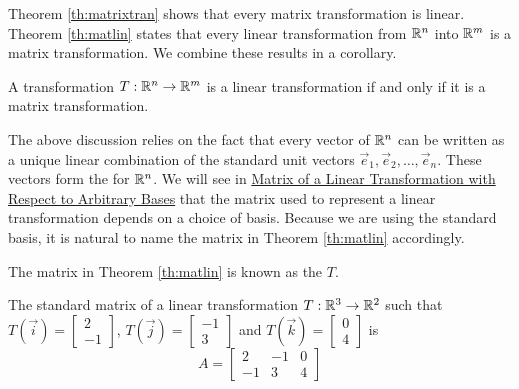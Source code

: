 \documentclass{ximera}
\begin{document}
Theorem \ref{th:matrixtran} shows that every matrix transformation is linear.  Theorem \ref{th:matlin} states that every linear transformation from $\mathbb{R}^n$ into $\mathbb{R}^m$ is a matrix transformation.  We combine these results in a corollary.

  \begin{corollary}\label{cor:lintransmattrans} A transformation $T:\mathbb{R}^n\rightarrow\mathbb{R}^m$ is a linear transformation if and only if it is a matrix transformation.
\end{corollary}  

The above discussion relies on the fact that every vector of $\mathbb{R}^n$ can be written as a unique linear combination of the standard unit vectors $\vec{e}_1,\vec{e}_2,\dots,\vec{e}_n$.  These vectors form the  for $\mathbb{R}^n$.  We will see in \href{https://ximera.osu.edu/oerlinalg/LinearAlgebra/LTR-0080/main}{Matrix of a Linear Transformation with Respect to Arbitrary Bases} that the matrix used to represent a linear transformation depends on a choice of basis.  Because we are using the standard basis, it is natural to name the matrix in Theorem \ref{th:matlin} accordingly.

\begin{definition} \label{def:standardmatoflintrans}
  
The matrix in Theorem \ref{th:matlin} is known as the  $T$.
  
\end{definition}





 \begin{example}\label{ex:findmatrix2}
 The standard matrix of a linear transformation $T:\mathbb{R}^3\rightarrow \mathbb{R}^2$ such that $T(\vec{i})=\begin{bmatrix}2\\-1\end{bmatrix}$, $T(\vec{j})=\begin{bmatrix}-1\\3\end{bmatrix}$ and $T(\vec{k})=\begin{bmatrix}0\\4\end{bmatrix}$ is
 $$A=\begin{bmatrix}2&-1&0\\-1&3&4\end{bmatrix}$$
 \end{example}
 
\end{document}

